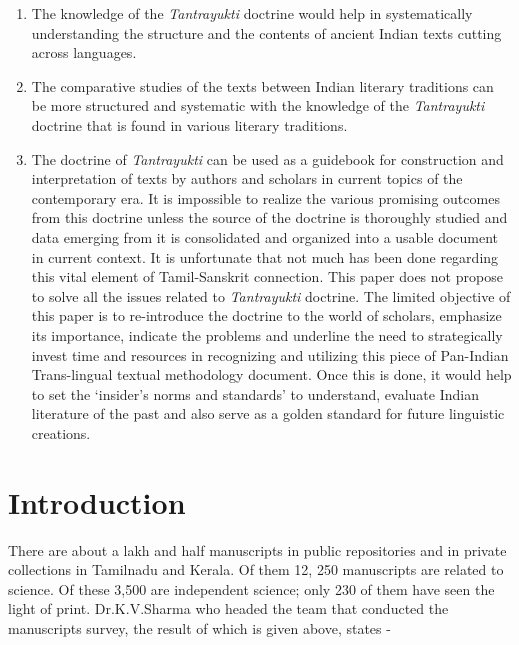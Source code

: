 \begin{enumerate}[{\rm a)}]
\itemsep=0pt
\item The knowledge of the \textit{Tantrayukti} doctrine would help in systematically understanding the structure and the contents of ancient Indian texts cutting across languages.

 \item The comparative studies of the texts between Indian literary traditions can be more structured and systematic with the knowledge of the \textit{Tantrayukti} doctrine that is found in various literary traditions.
 
 \item The doctrine of \textit{Tantrayukti} can be used as a guidebook for construction and interpretation of texts by authors and scholars in current topics of the contemporary era. It is impossible to realize the various promising outcomes from this doctrine unless the source of the doctrine is thoroughly studied and data emerging from it is consolidated and organized into a usable document in current context. It is unfortunate that not much has been done regarding this vital element of Tamil-Sanskrit connection. This paper does not propose to solve all the issues related to \textit{Tantrayukti} doctrine. The limited objective of this paper is to re-introduce the doctrine to the world of scholars, emphasize its importance, indicate the problems and underline the need to strategically invest time and resources in recognizing and utilizing this piece of Pan-Indian Trans-lingual textual methodology document. Once this is done, it would help to set the ‘insider’s norms and standards’ to understand, evaluate Indian literature of the past and also serve as a golden standard for future linguistic creations.

\end{enumerate}


\section*{Introduction}

There are about a lakh and half manuscripts in public repositories and in private collections in Tamilnadu and Kerala. Of them 12, 250 manuscripts are related to science. Of these 3,500 are independent science; only 230 of them have seen the light of print. Dr.K.V.Sharma who headed the team that conducted the manuscripts survey, the result of which is given above, states -


